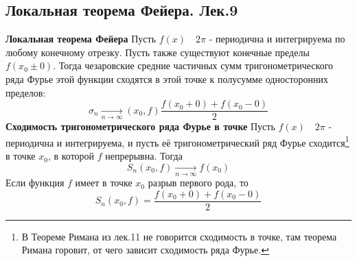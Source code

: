 \documentclass{article}
\begin{document}
\subsection{Локальная теорема Фейера. Лек.9}
	\textbf{Локальная теорема Фейера} Пусть $f(x)\quad2\pi$ - периодична и интегрируема по любому конечному отрезку. Пусть также существуют конечные пределы $ f\left(x_{0} \pm 0\right) $. Тогда чезаровские средние частичных сумм тригонометрического ряда Фурье этой функции сходятся в этой точке к полусумме односторонних пределов:
	\begin{equation}
	\sigma_{n}\underset{n \rightarrow \infty}{\longrightarrow}\left(x_{0}, f\right) \frac{f\left(x_{0}+0\right)+f\left(x_{0}-0\right)}{2}
	\end{equation}
	\textbf{Сходимость тригонометрического ряда Фурье в точке} Пусть $f(x)\quad2\pi$ - периодична и интегрируема, и пусть её тригонометрический ряд Фурье сходится\footnote{В Теореме Римана из лек.11 не говорится сходимость в точке, там теорема Римана горовит, от чего зависит сходимость ряда Фурье.} в точке $ x_{0}$, в которой $ f $ непрерывна. Тогда
	\begin{equation}
	S_{n}\left(x_{0}, f\right) \underset{n \rightarrow \infty}{\longrightarrow} f\left(x_{0}\right)
	\end{equation}
	Если функция $ f $ имеет в точке $ x_{0} $ разрыв первого рода, то
	\begin{equation}
	S_{n}\left(x_{0}, f\right)=\frac{f\left(x_{0}+0\right)+f\left(x_{0}-0\right)}{2}
	\end{equation}	
\end{document}
